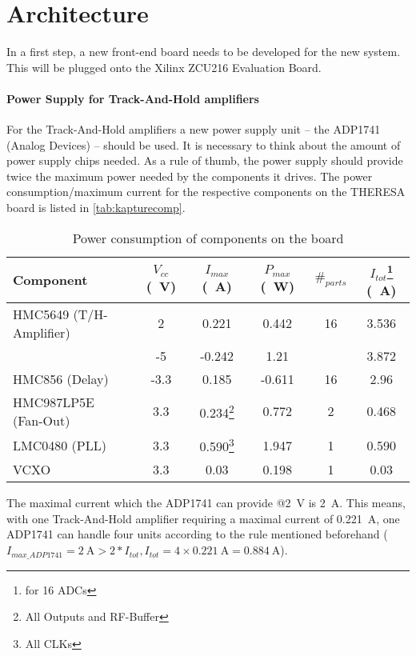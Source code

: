 \section{Architecture}
In a first step, a new front-end board needs to be developed for the new system. This will be plugged onto the Xilinx ZCU216 Evaluation Board.

\paragraph{Power Supply for Track-And-Hold amplifiers}
For the Track-And-Hold amplifiers a new power supply unit -- the ADP1741 (Analog Devices) -- should be used. It is necessary to think about the amount of power supply chips needed. As a rule of thumb, the power supply should provide twice the maximum power needed by the components it drives. The power consumption/maximum current for the respective components on the THERESA board is listed in \autoref{tab:kapturecomp}. 
\begin{table}[tbh!]
	\caption{Power consumption of components on the board}
	\label{tab:kapturecomp}
	\begin{minipage}{\textwidth}
		\centering
		\begin{tabularx}{\textwidth}{XSSSSS}
			\toprule
			\textbf{Component} & \textbf{$V_{cc}$ (\SI{}{\volt})} & \textbf{$I_{max}$ (\SI{}{\ampere})} & \textbf{$P_{max}$ (\SI{}{\watt})} & $\#_{parts}$ & \textbf{$I_{tot}$}\footnote{for 16 ADCs} (\SI{}{\ampere})\\
				\midrule
			HMC5649 (T/H-Amplifier) 	& 2	  	& 0.221 	 & 0.442 & 16 & 3.536\\
									& -5  	& -0.242 & 1.21 &  & 3.872\\
			HMC856 (Delay) 			& -3.3	& 0.185 & -0.611 & 16 & 2.96\\
			HMC987LP5E (Fan-Out) 	& 3.3 	& 0.234\footnote{All Outputs and RF-Buffer} & 0.772 & 2 & 0.468\\
			LMC0480 (PLL) 			& 3.3 	& 0.590\footnote{All CLKs} & 1.947 & 1 & 0.590\\
			VCXO 					& 3.3 	& 0.03 & 0.198 & 1 & 0.03\\
			\bottomrule
		\end{tabularx}
	\end{minipage}
\end{table}

The maximal current which the ADP1741 can provide @\SI{2}{\volt} is \SI{2}{\ampere}. This means, with one Track-And-Hold amplifier requiring a maximal current of \SI{0.221}{\ampere}, one ADP1741 can handle four units according to the rule mentioned beforehand ($I_{max\_ADP1741} = \SI{2}{\ampere} > 2 * I_{tot}, I_{tot} = 4 \times \SI{0.221}{\ampere} =  \SI{0.884}{\ampere}$).


